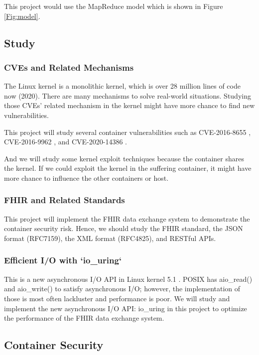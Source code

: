 \documentclass[12pt,a4paper]{article}
\begin{document}
This project would use the MapReduce model which is shown in Figure \ref*{Fig:model}.

\subsection{Study}
\subsubsection{CVEs and Related Mechanisms}
The Linux kernel is a monolithic kernel, which is over 28 million lines of code now (2020). There
are many mechanisms to solve real-world situations. Studying those CVEs' related mechanism in the
kernel might have more chance to find new vulnerabilities.

This project will study several container vulnerabilities such as CVE-2016-8655
\cite{CVE-2016-8655}, CVE-2016-9962 \cite{CVE-2016-9962}, and CVE-2020-14386 \cite{CVE-2020-14386}.

And we will study some kernel exploit techniques \cite{Kernel_exploitation} because the container shares
the kernel. If we could exploit the kernel in the suffering container, it might have more chance
to influence the other containers or host.

\subsubsection{FHIR and Related Standards}
This project will implement the FHIR \cite{FHIR_home} data exchange system to demonstrate the container
security risk. Hence, we should study the FHIR standard, the JSON format (RFC7159), the XML format
(RFC4825), and RESTful APIs.

\subsubsection{Efficient I/O with `io\_uring`}
This is a new asynchronous I/O API in Linux kernel 5.1 \cite{Efficient_IO_uring}. POSIX has
aio\_read() and aio\_write() to satisfy asynchronous I/O; however, the implementation of those
is most often lackluster and performance is poor. We will study and implement the new asynchronous
I/O API: io\_uring in this project to optimize the performance of the FHIR data exchange system.

\subsection{Container Security}
\end{document}
